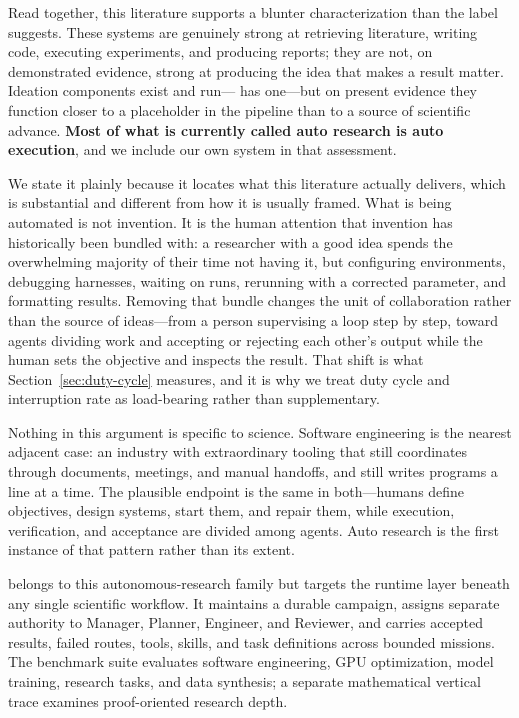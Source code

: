 Read together, this literature supports a blunter characterization than the label
suggests. These systems are genuinely strong at retrieving literature, writing code,
executing experiments, and producing reports; they are not, on demonstrated evidence,
strong at producing the idea that makes a result matter. Ideation components exist and
run---\systemname{} has one---but on present evidence they function closer to a
placeholder in the pipeline than to a source of scientific advance. \textbf{Most of
what is currently called auto research is auto execution}, and we include our own
system in that assessment.

We state it plainly because it locates what this literature actually delivers, which
is substantial and different from how it is usually framed. What is being automated
is not invention. It is the human attention that invention has historically been
bundled with: a researcher with a good idea spends the overwhelming majority of their
time not having it, but configuring environments, debugging harnesses, waiting on
runs, rerunning with a corrected parameter, and formatting results. Removing that
bundle changes the unit of collaboration rather than the source of ideas---from a
person supervising a loop step by step, toward agents dividing work and accepting or
rejecting each other's output while the human sets the objective and inspects the
result. That shift is what Section~\ref{sec:duty-cycle} measures, and it is why we
treat duty cycle and interruption rate as load-bearing rather than supplementary.

Nothing in this argument is specific to science. Software engineering is the nearest
adjacent case: an industry with extraordinary tooling that still coordinates through
documents, meetings, and manual handoffs, and still writes programs a line at a time.
The plausible endpoint is the same in both---humans define objectives, design
systems, start them, and repair them, while execution, verification, and acceptance
are divided among agents. Auto research is the first instance of that pattern rather
than its extent.

\systemname belongs to this autonomous-research family but targets the runtime
layer beneath any single scientific workflow. It maintains a durable campaign,
assigns separate authority to Manager, Planner, Engineer, and Reviewer, and carries
accepted results, failed routes, tools, skills, and task definitions across bounded
missions. The benchmark suite evaluates software engineering, GPU optimization,
model training, research tasks, and data synthesis; a separate mathematical vertical
trace examines proof-oriented research depth.

